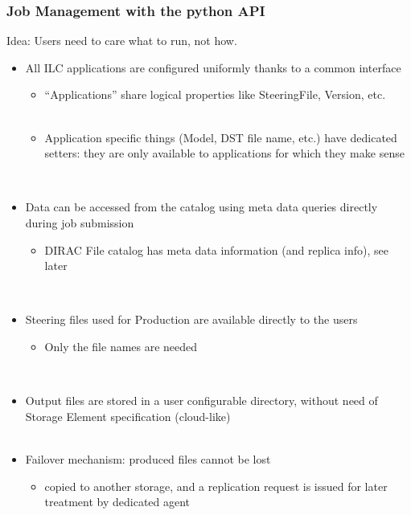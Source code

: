 \documentclass[10pt,table,dvipsnames]{beamer}
\begin{document}
\begin{frame}
  \frametitle{Job Management with the python API}
Idea: \alert{Users need to care what to run, not how.}
\begin{itemize}
\item All ILC {\color{NavyBlue}applications are configured uniformly} thanks to a common interface
  \begin{itemize}
  \item {\color{ForestGreen} ``Applications'' share logical properties} like SteeringFile,
    Version, etc.\\
~\\
  \item {\color{ForestGreen}Application specific things} (Model, DST file name, etc.) have
    {\color{ForestGreen} dedicated setters}: they are only available to applications for
    which they make sense
  \end{itemize}
~\\
\item {\color{NavyBlue}Data can be accessed} from the catalog using {\color{NavyBlue}meta data queries}
  directly during job submission
  \begin{itemize}
  \item DIRAC File catalog has meta data information (and replica
    info), see later\\
  \end{itemize}
~\\
\item {\color{NavyBlue}Steering files} used for Production are {\color{NavyBlue}available directly} to the
  users
  \begin{itemize}
  \item Only the file names are needed
  \end{itemize}
~\\
\item {\color{NavyBlue}Output files} are stored in a user configurable directory,
  without need of Storage Element specification
  ({\color{NavyBlue}cloud-like})\\
~\\
\item Failover mechanism: \alert{produced files cannot be lost}
  \begin{itemize}
  \item   copied to another storage, and a replication request is issued for
  later treatment by dedicated agent
  \end{itemize}
\end{itemize}
\end{frame}
\end{document}

